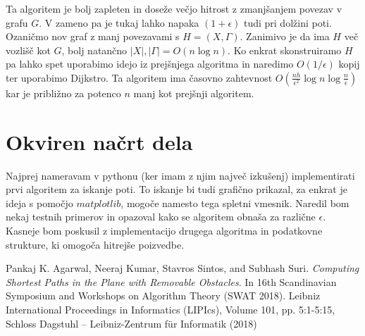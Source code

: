 \documentclass{article}
\begin{document}
Ta algoritem je bolj zapleten in doseže večjo hitrost z zmanjšanjem povezav v grafu $G$. V zameno pa je tukaj lahko napaka $(1+\epsilon)$ tudi pri dolžini poti. Ozaničmo nov graf z manj povezavami s $H = (X,\Gamma)$. Zanimivo je da ima $H$ več vozlišč kot $G$, bolj natančno $|X|, |\Gamma| = O(n \log n)$. Ko enkrat skonstruiramo $H$ pa lahko spet uporabimo idejo iz prejšnjega algoritma in naredimo $O(1/\epsilon)$ kopij ter uporabimo Dijkstro. Ta algoritem ima časovno zahtevnost $O(\frac{nh}{\epsilon^2}\log n \log \frac{n}{\epsilon})$ kar je približno za potenco $n$ manj kot prejšnji algoritem.


\section*{Okviren načrt dela}

Najprej nameravam v pythonu (ker imam z njim največ izkušenj) implementirati prvi algoritem za iskanje poti. To iskanje bi tudi grafično prikazal, za enkrat je ideja s pomočjo $matplotlib$, mogoče namesto tega spletni vmesnik. Naredil bom nekaj testnih primerov in opazoval kako se algoritem obnaša za različne $\epsilon$. Kasneje bom poskusil z implementacijo drugega algoritma in podatkovne strukture, ki omogoča hitrejše poizvedbe.


\begin{thebibliography}{99}

     Pankaj K. Agarwal, Neeraj Kumar, Stavros Sintos, and Subhash Suri. \emph{Computing Shortest Paths in the Plane with Removable Obstacles}. In 16th Scandinavian Symposium and Workshops on Algorithm Theory (SWAT 2018). Leibniz International Proceedings in Informatics (LIPIcs), Volume 101, pp. 5:1-5:15, Schloss Dagstuhl – Leibniz-Zentrum für Informatik (2018)

\end{thebibliography}
\end{document}

